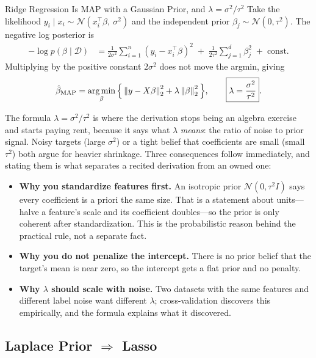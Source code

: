 \begin{mathresult}{Ridge Regression Is MAP with a Gaussian Prior, and $\lambda = \sigma^2/\tau^2$}
Take the likelihood $y_i \mid x_i \sim \mathcal{N}(x_i^\top\beta,\ \sigma^2)$ and the independent prior $\beta_j \sim \mathcal{N}(0, \tau^2)$. The negative log posterior is
\begin{align}
-\log p(\beta \mid \mathcal{D}) &= \frac{1}{2\sigma^2}\sum_{i=1}^n (y_i - x_i^\top\beta)^2 \;+\; \frac{1}{2\tau^2}\sum_{j=1}^d \beta_j^2 \;+\; \text{const} .
\end{align}
Multiplying by the positive constant $2\sigma^2$ does not move the argmin, giving
\begin{equation}
\hat\beta_{\text{MAP}} = \operatorname*{arg\,min}_\beta \Big\{ \left\lVert y - X\beta\right\rVert_2^2 + \lambda \left\lVert\beta\right\rVert_2^2 \Big\}, \qquad \boxed{\lambda = \frac{\sigma^2}{\tau^2}} .
\end{equation}
\end{mathresult}

The formula $\lambda = \sigma^2/\tau^2$ is where the derivation stops being an algebra exercise and starts paying rent, because it says what $\lambda$ \textit{means}: the ratio of noise to prior signal. Noisy targets (large $\sigma^2$) or a tight belief that coefficients are small (small $\tau^2$) both argue for heavier shrinkage. Three consequences follow immediately, and stating them is what separates a recited derivation from an owned one:

\begin{itemize}
    \item \textbf{Why you standardize features first.} An isotropic prior $\mathcal{N}(0,\tau^2 I)$ says every coefficient is a priori the same size. That is a statement about units---halve a feature's scale and its coefficient doubles---so the prior is only coherent after standardization. This is the probabilistic reason behind the practical rule, not a separate fact.
    \item \textbf{Why you do not penalize the intercept.} There is no prior belief that the target's mean is near zero, so the intercept gets a flat prior and no penalty.
    \item \textbf{Why $\lambda$ should scale with noise.} Two datasets with the same features and different label noise want different $\lambda$; cross-validation discovers this empirically, and the formula explains what it discovered.
\end{itemize}

\subsection{Laplace Prior $\Rightarrow$ Lasso}

